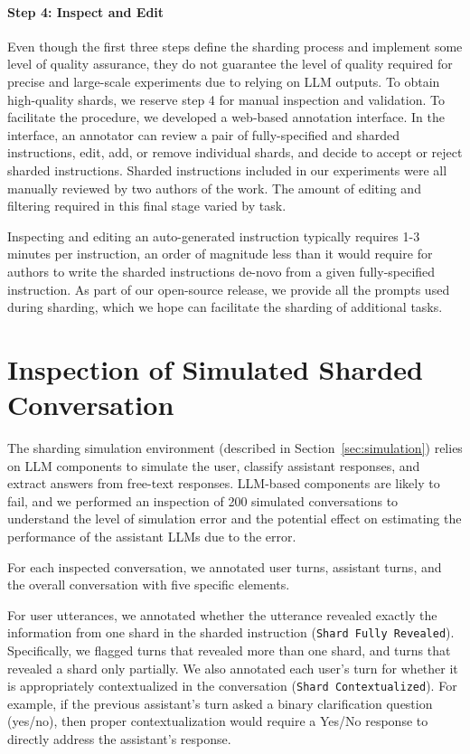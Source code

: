 \documentclass{article}
\begin{document}
\begin{appendices}
\paragraph{Step 4: Inspect and Edit} Even though the first three steps define the sharding process and implement some level of quality assurance, they do not guarantee the level of quality required for precise and large-scale experiments due to relying on LLM outputs. To obtain high-quality shards, we reserve step 4 for manual inspection and validation. To facilitate the procedure, we developed a web-based annotation interface. In the interface, an annotator can review a pair of fully-specified and sharded instructions, edit, add, or remove individual shards, and decide to accept or reject sharded instructions. Sharded instructions included in our experiments were all manually reviewed by two authors of the work. The amount of editing and filtering required in this final stage varied by task.

Inspecting and editing an auto-generated instruction typically requires 1-3 minutes per instruction, an order of magnitude less than it would require for authors to write the sharded instructions de-novo from a given fully-specified instruction.
As part of our open-source release, we provide all the prompts used during sharding, which we hope can facilitate the sharding of additional tasks.

\section{Inspection of Simulated Sharded Conversation} \label{app:inspection}



The sharding simulation environment (described in Section~\ref{sec:simulation}) relies on LLM components to simulate the user, classify assistant responses, and extract answers from free-text responses. LLM-based components are likely to fail, and we performed an inspection of 200 simulated \shardedt conversations to understand the level of simulation error and the potential effect on estimating the performance of the assistant LLMs due to the error.

For each inspected conversation, we annotated user turns, assistant turns, and the overall conversation with five specific elements.

For user utterances, we annotated whether the utterance revealed exactly the information from one shard in the sharded instruction (\texttt{Shard Fully Revealed}). Specifically, we flagged turns that revealed more than one shard, and turns that revealed a shard only partially. We also annotated each user's turn for whether it is appropriately contextualized in the conversation (\texttt{Shard Contextualized}). For example, if the previous assistant's turn asked a binary clarification question (yes/no), then proper contextualization would require a Yes/No response to directly address the assistant's response.


\end{appendices}
\end{document}
